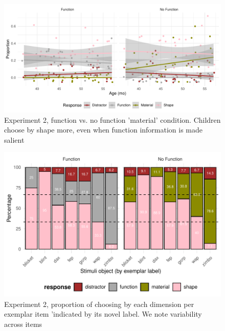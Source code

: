 \documentclass[10pt, letterpaper]{article}
\newenvironment{CodeChunk}{}{}
\begin{document}
\begin{CodeChunk}
\begin{figure}[!h]
\includegraphics[width=1\linewidth]{figs/jitter_function-1} \caption[Experiment 2, function vs]{Experiment 2, function vs. no function 'material'  condition. Children choose by shape more, even when function information is made salient}\label{fig:jitter_function}
\end{figure}
\end{CodeChunk}

\begin{CodeChunk}
\begin{figure}[tb]
\includegraphics[width=1\linewidth]{figs/sec_exp_stim-1} \caption[Experiment 2, proportion of choosing by each dimension per exemplar item 'indicated by its novel label]{Experiment 2, proportion of choosing by each dimension per exemplar item 'indicated by its novel label. We note variability across items}\label{fig:sec_exp_stim}
\end{figure}
\end{CodeChunk}
\end{document}

